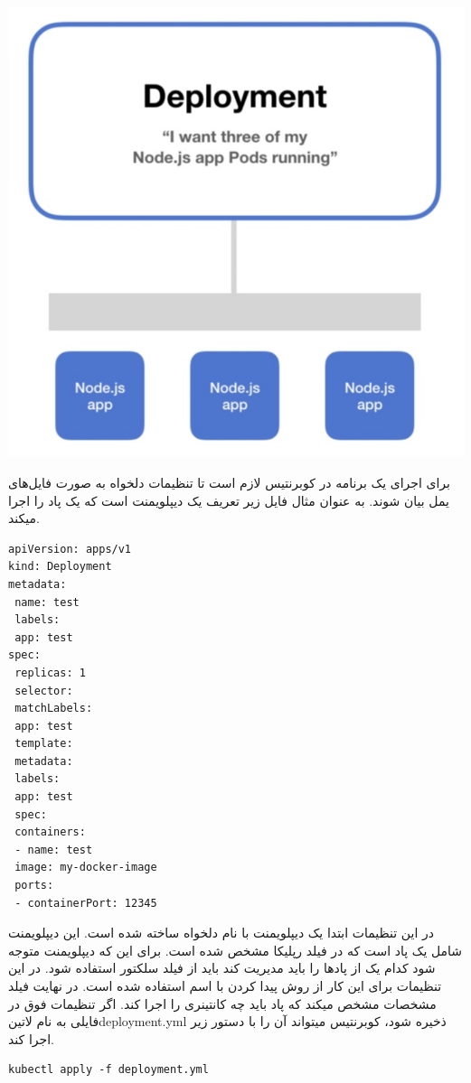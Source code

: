 \documentclass[a4]{report}
\begin{document}
\includegraphics[scale=0.5]{fig/deployment}

برای اجرای یک برنامه در کوبرنتیس لازم است تا تنظیمات دلخواه به صورت فایل‌های یمل
بیان شوند. به عنوان مثال فایل زیر تعریف یک دیپلویمنت است که یک پاد را اجرا میکند.

\begin{latin}
\begin{verbatim}
apiVersion: apps/v1
kind: Deployment
metadata:
 name: test
 labels:
 app: test
spec:
 replicas: 1
 selector:
 matchLabels:
 app: test
 template:
 metadata:
 labels:
 app: test
 spec:
 containers:
 - name: test
 image: my-docker-image
 ports:
 - containerPort: 12345
\end{verbatim}
\end{latin}

در این تنظیمات ابتدا یک دیپلویمنت با نام دلخواه ساخته شده است. این دیپلویمنت شامل یک پاد است که در فیلد رپلیکا مشخص شده است. برای این که دیپلویمنت متوجه شود کدام یک از پادها را باید مدیریت کند باید از فیلد سلکتور
استفاده شود. در این تنظیمات برای این کار از روش پیدا کردن با اسم استفاده شده است. در نهایت فیلد مشخصات مشخص میکند که پاد باید چه کانتینری را اجرا کند.
اگر تنظیمات فوق در فایلی به نام ‌لاتین{deployment.yml} ذخیره شود، کوبرنتیس میتواند آن را با دستور
زیر اجرا کند.

\begin{latin}
\begin{verbatim}
kubectl apply -f deployment.yml
\end{verbatim}
\end{latin}
\end{document}
